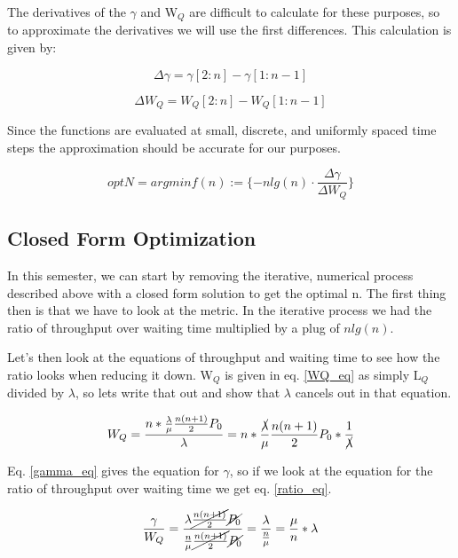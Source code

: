 \documentclass[conference]{IEEEtran}
\begin{document}
The derivatives of the $\gamma$ and W$_Q$ are difficult to calculate for these purposes, so to approximate 
the derivatives we will use the first differences. This calculation is given by:

\begin{equation}
\Delta \gamma = \gamma[2:n] - \gamma[1:n-1]\label{deltagamma_eq}
\end{equation}

\begin{equation}
\Delta W_Q  = W_Q [2:n] - W_Q [1:n-1]\label{deltawq_eq}
\end{equation}

Since the functions are evaluated at small, discrete, and uniformly spaced time steps the approximation 
should be accurate for our purposes. 

\begin{equation}
optN=argmin f(n):=\{ -nlg(n)\cdot\frac{\Delta \gamma}{\Delta W_Q}\}\label{optn_eq}
\end{equation}

\subsection{Closed Form Optimization}\label{closed_opt}

In this semester, we can start by removing the iterative, numerical process described above with 
a closed form solution to get the optimal n. The first thing then is that we have to look at the metric.
In the iterative process we had the ratio of throughput over waiting time multiplied by a plug of $n lg(n)$. 

Let's then look at the equations of throughput and waiting time to see how the ratio looks when reducing it 
down. W$_Q$ is given in eq. \ref{WQ_eq} as simply L$_Q$ divided by $\lambda$, so lets write that out and 
show that $\lambda$ cancels out in that equation.

\begin{equation}
W_Q=\frac{n\ast\frac{\lambda}{\mu}\frac{n(n+1)}{2}P_0}{\lambda}=n\ast\frac{\cancel{\lambda}}{\mu}\frac{n(n+1)}{2}P_0\ast\frac{1}{\cancel{\lambda}}\label{WQ_reduced}
\end{equation}

Eq. \ref{gamma_eq} gives the equation for $\gamma$, so if we look at the equation for the ratio of throughput over waiting time we get eq. \ref{ratio_eq}. 

\begin{equation}
\frac{\gamma}{W_Q}=\frac{\lambda\cancel{\frac{n(n+1)}{2}}\cancel{P_0}}{\frac{n}{\mu}\cancel{\frac{n(n+1)}{2}}\cancel{P_0}}=\frac{\lambda}{\frac{n}{\mu}}=\frac{\mu}{n}\ast\lambda\label{ratio_eq}
\end{equation}
\end{document}
